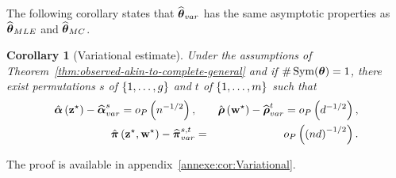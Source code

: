 \documentclass[bj]{imsart}
\numberwithin{equation}{section}
\theoremstyle{plain}
\newtheorem{corollaire}[thm]{Corollary}
\theoremstyle{remark}
\newcommand{\VB}[1]{\textcolor{purple}{#1}}
\begin{document}
The following corollary states that $\widehat{\boldsymbol{\theta}}_{var}$ has the same asymptotic properties as $\widehat{\boldsymbol{\theta}}_{MLE}$ and $\widehat{\boldsymbol{\theta}}_{MC}$.
\begin{corollaire}[Variational estimate]\label{cor:Variational}
Under the assumptions of Theorem~\ref{thm:observed-akin-to-complete-general} and if $\# \operatorname{Sym}(\boldsymbol{\theta})=1$, there exist permutations $s$ of $\{1, \dots, g\}$ and $t$ of $\{1, \dots, m\}$ such that
\begin{eqnarray*}
\hat{\bpi}\left(\bzs\right)-\bpivar^{s}=o_{P}\left(\n^{-1/2}\right),&&\hat{\brho}\left(\bws\right)-\brhovar^{t}=o_{P}\left(\dd^{-1/2}\right),\\
\hat{\bal}\left(\bzs,\bws\right)-\balvar^{s,t}&=&o_{P}\left(\left(\n\dd\right)^{-1/2}\right).
\end{eqnarray*}
\begin{comment}
Moreover, 
  \begin{eqnarray}  
  \label{cor:Variational:plus}
    \frac{\underset{\setQ\in\mcQ}{\max}\;\exp\left[\Jvar\left(\setQ,\btheta\right)\right]}{\prob(\bx; \bthetas)} =  \frac{1}{\# \Symmetric(\bthetas)} \max_{\btheta' \sim \btheta}\frac{\prob(\bx, \bzs, \bws; \btheta')}{\prob(\bx, \bzs, \bws; \bthetas)}\left(1 + \smallO_P(1)\right) + \smallO_P(1)
\end{eqnarray} 
  where the $\smallO_P$ is uniform over all $\btheta \in \bTheta\backslash\left\{\btheta\in\bTheta|\# \Symmetric(\btheta)=1\right\}$.
  \end{comment}
\end{corollaire}
The proof is available in appendix~\ref{annexe:cor:Variational}.
\end{document}
